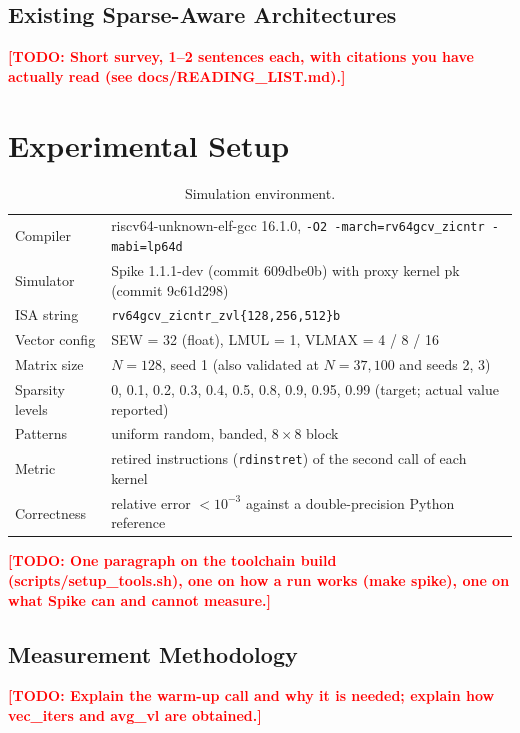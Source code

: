 \documentclass[11pt,a4paper]{article}
\newcommand{\todo}[1]{\textcolor{red}{\textbf{[TODO: #1]}}}
\begin{document}
\subsection{Existing Sparse-Aware Architectures}
\todo{Short survey, 1--2 sentences each, with citations you have actually read (see docs/READING\_LIST.md).}

\section{Experimental Setup}
\begin{table}[H]
\centering
\caption{Simulation environment.}
\begin{tabular}{ll}
\toprule
Compiler & riscv64-unknown-elf-gcc 16.1.0, \texttt{-O2 -march=rv64gcv\_zicntr -mabi=lp64d} \\
Simulator & Spike 1.1.1-dev (commit 609dbe0b) with proxy kernel pk (commit 9c61d298) \\
ISA string & \texttt{rv64gcv\_zicntr\_zvl\{128,256,512\}b} \\
Vector config & SEW = 32 (float), LMUL = 1, VLMAX = 4 / 8 / 16 \\
Matrix size & $N = 128$, seed 1 (also validated at $N = 37, 100$ and seeds 2, 3) \\
Sparsity levels & 0, 0.1, 0.2, 0.3, 0.4, 0.5, 0.8, 0.9, 0.95, 0.99 (target; actual value reported) \\
Patterns & uniform random, banded, $8\times8$ block \\
Metric & retired instructions (\texttt{rdinstret}) of the second call of each kernel \\
Correctness & relative error $< 10^{-3}$ against a double-precision Python reference \\
\bottomrule
\end{tabular}
\end{table}
\todo{One paragraph on the toolchain build (scripts/setup\_tools.sh), one on how a run works (make spike), one on what Spike can and cannot measure.}

\subsection{Measurement Methodology}
\todo{Explain the warm-up call and why it is needed; explain how vec\_iters and avg\_vl are obtained.}
\begin{table}[H]
\centering
\caption{Instructions retired by the first (cold) and second (warm) call of each kernel. $N=128$, VLEN = 512, uniform, sparsity 0.}

\end{table}
\end{document}

